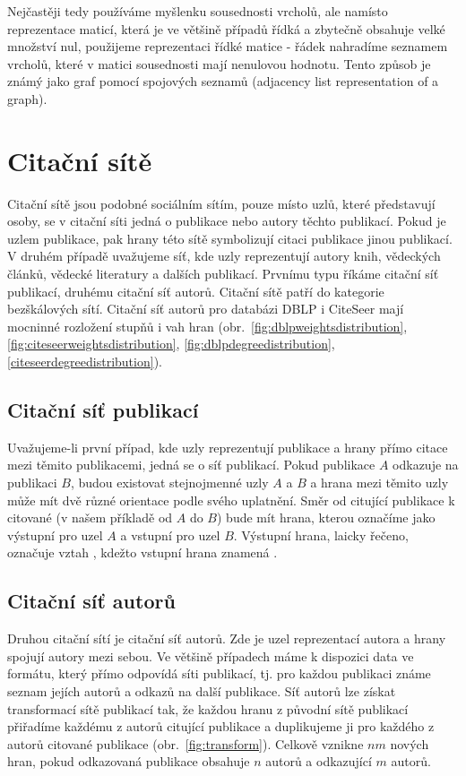 \documentclass{bakalarka}
\begin{document}
Nejčastěji tedy používáme myšlenku sousednosti vrcholů, ale namísto
reprezentace maticí, která je ve většině případů řídká a zbytečně obsahuje
velké množství nul, použijeme reprezentaci řídké matice - řádek nahradíme
seznamem vrcholů, které v matici sousednosti mají nenulovou hodnotu. Tento
způsob je známý jako graf pomocí spojových seznamů (adjacency list
representation of a graph).


\section{Citační sítě}
Citační sítě jsou podobné sociálním sítím, pouze místo uzlů, které představují
osoby, se v citační síti jedná o publikace nebo autory těchto publikací. Pokud
je uzlem publikace, pak hrany této sítě symbolizují citaci publikace jinou
publikací. V druhém případě uvažujeme síť, kde uzly reprezentují autory knih,
vědeckých článků, vědecké literatury a dalších publikací. Prvnímu typu říkáme
citační síť publikací, druhému citační síť autorů. Citační sítě patří do
kategorie bezškálových sítí. Citační síť autorů pro databázi DBLP i CiteSeer
mají mocninné rozložení stupňů i vah hran
(obr.~\ref{fig:dblpweightsdistribution}, \ref{fig:citeseerweightsdistribution},
\ref{fig:dblpdegreedistribution}, \ref{citeseerdegreedistribution}).

\subsection{Citační síť publikací}
Uvažujeme-li první případ, kde uzly reprezentují publikace a hrany přímo citace
mezi těmito publikacemi, jedná se o síť publikací. Pokud publikace $A$ odkazuje
na publikaci $B$, budou existovat stejnojmenné uzly $A$ a $B$ a hrana mezi
těmito uzly může mít dvě různé orientace podle svého uplatnění. Směr od
citující publikace k citované (v našem příkladě od $A$ do $B$) bude mít hrana,
kterou označíme jako výstupní pro uzel $A$ a vstupní pro uzel $B$.  Výstupní
hrana, laicky řečeno, označuje vztah , kdežto vstupní hrana znamená
.

\subsection{Citační síť autorů}
Druhou citační sítí je citační síť autorů. Zde je uzel reprezentací autora a
hrany spojují autory mezi sebou. Ve většině případech máme k dispozici data ve
formátu, který přímo odpovídá síti publikací, tj. pro každou publikaci známe
seznam jejích autorů a odkazů na další publikace. Síť autorů lze získat
transformací sítě publikací tak, že každou hranu z původní sítě publikací
přiřadíme každému z autorů citující publikace a duplikujeme ji pro každého z
autorů citované publikace (obr.~\ref{fig:transform}). Celkově vznikne $nm$
nových hran, pokud odkazovaná publikace obsahuje $n$ autorů a odkazující $m$
autorů. 
\end{document}
